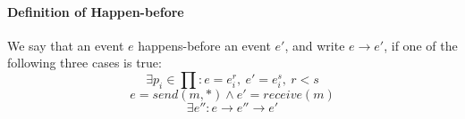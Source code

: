 \documentclass[11pt]{article}
\begin{document}
\paragraph{Definition of Happen-before} %
\label{par:definition_of_happen_before}
We say that an event $e$ happens-before an event $e'$, and write $e \rightarrow e'$, if one of the following three cases is true:
\[
	\exists p_i \in \prod : e = e_i^r, \ e'= e^s_i,\ r < s
\]
\[
	e = send(m,*) \land e' = receive(m) 
\]
\[
	\exists e'': e \rightarrow e'' \rightarrow e' 
\]


\end{document}
